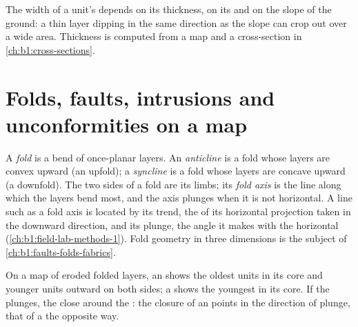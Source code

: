 \begin{remark}\label{rem:b1:geological-maps:width}
The width of a unit's  depends on its thickness, on its  and on the
slope of the ground: a thin layer dipping in the same direction as the slope
can crop out over a wide area. Thickness is computed from a map and a
cross-section in \cref{ch:b1:cross-sections}.
\end{remark}

\section{Folds, faults, intrusions and unconformities on a map}

\begin{definition}\label{def:b1:geological-maps:fold}
A \emph{fold} is a bend of once-planar layers. An
\emph{anticline} is a fold whose layers are convex upward
(an upfold); a \emph{syncline} is a fold whose layers are
concave upward (a downfold). The two sides of a fold are its limbs; its
\emph{fold axis} is the line along which the layers bend
most, and the axis plunges when it is not horizontal. A line such as a fold
axis is located by its trend, the  of its horizontal projection taken
in the downward direction, and its plunge, the angle it makes with the
horizontal (\cref{ch:b1:field-lab-methods-1}). Fold geometry in
three dimensions is the subject of \cref{ch:b1:faults-folds-fabrics}.
\end{definition}

\begin{proposition}\label{prop:b1:geological-maps:folds}
On a map of eroded folded layers, an  shows the oldest
units in its core and younger units outward on both sides; a 
shows the youngest in its core. If the  plunges, the
 close around the : the closure of an  points in the
direction of plunge, that of a  the opposite way.
\end{proposition}

